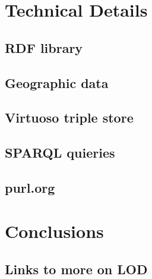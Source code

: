 \documentclass[11pt,twoside,a4paper]{article}
\begin{document}
\section{Technical Details}
    \subsection{RDF library}
    \subsection{Geographic data}
    \subsection{Virtuoso triple store}
    \subsection{SPARQL quieries}
    \subsection{purl.org}

\section{Conclusions}
\subsection{Links to more on LOD}
\end{document}
